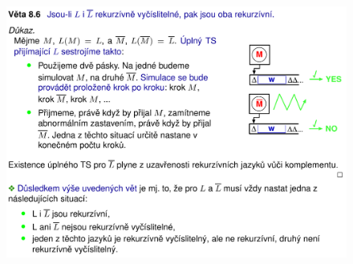 \begin{figure}[H]
    \centering
    \includegraphics[width=1\linewidth]{uzaverove_vlasnosti_L0_05.pdf}
\end{figure}


